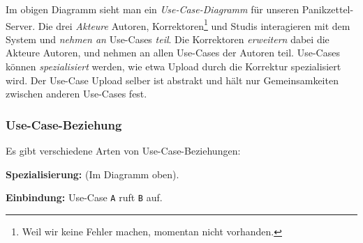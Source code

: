 \documentclass[german]{panikzettel}
\begin{document}

Im obigen Diagramm sieht man ein \emph{Use-Case-Diagramm} für unseren Panikzettel-Server.
Die drei \emph{Akteure} Autoren, Korrektoren\footnote{Weil wir keine Fehler machen, momentan nicht vorhanden.} und Studis interagieren mit dem System und \emph{nehmen an} Use-Cases \emph{teil}.
Die Korrektoren \emph{erweitern} dabei die Akteure Autoren, und nehmen an allen Use-Cases der Autoren teil.
Use-Cases können \emph{spezialisiert} werden, wie etwa Upload durch die Korrektur spezialisiert wird.
Der Use-Case Upload selber ist abstrakt und hält nur Gemeinsamkeiten zwischen anderen Use-Cases fest.

\subsubsection{Use-Case-Beziehung}

Es gibt verschiedene Arten von Use-Case-Beziehungen:

\textbf{Spezialisierung:} (Im Diagramm oben).


\textbf{Einbindung:} Use-Case \lstinline{A} ruft \lstinline{B} auf.

\end{document}
